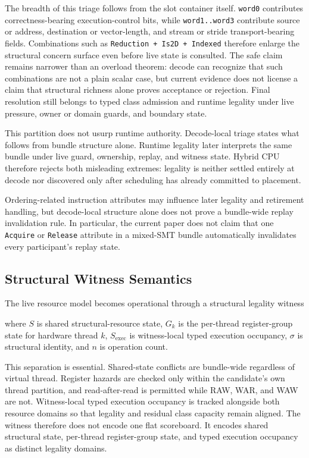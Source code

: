 \documentclass[twocolumn]{article}
\begin{document}
The breadth of this triage follows from the slot container itself. \texttt{word0} contributes correctness-bearing execution-control bits, while \texttt{word1..word3} contribute source or address, destination or vector-length, and stream or stride transport-bearing fields. Combinations such as \texttt{Reduction + Is2D + Indexed} therefore enlarge the structural concern surface even before live state is consulted. The safe claim remains narrower than an overload theorem: decode can recognize that such combinations are not a plain scalar case, but current evidence does not license a claim that structural richness alone proves acceptance or rejection. Final resolution still belongs to typed class admission and runtime legality under live pressure, owner or domain guards, and boundary state.

This partition does not usurp runtime authority. Decode-local triage states what follows from bundle structure alone. Runtime legality later interprets the same bundle under live guard, ownership, replay, and witness state. Hybrid CPU therefore rejects both misleading extremes: legality is neither settled entirely at decode nor discovered only after scheduling has already committed to placement.

Ordering-related instruction attributes may influence later legality and retirement handling, but decode-local structure alone does not prove a bundle-wide replay invalidation rule. In particular, the current paper does not claim that one \texttt{Acquire} or \texttt{Release} attribute in a mixed-SMT bundle automatically invalidates every participant's replay state.


\subsection{Structural Witness Semantics}

The live resource model becomes operational through a structural legality witness



where \(S\) is shared structural-resource state, \(G_k\) is the per-thread register-group state for hardware thread \(k\), \(S_{\mathrm{exec}}\) is witness-local typed execution occupancy, \(\sigma\) is structural identity, and \(n\) is operation count.

This separation is essential. Shared-state conflicts are bundle-wide regardless of virtual thread. Register hazards are checked only within the candidate's own thread partition, and read-after-read is permitted while RAW, WAR, and WAW are not. Witness-local typed execution occupancy is tracked alongside both resource domains so that legality and residual class capacity remain aligned. The witness therefore does not encode one flat scoreboard. It encodes shared structural state, per-thread register-group state, and typed execution occupancy as distinct legality domains.
\end{document}
